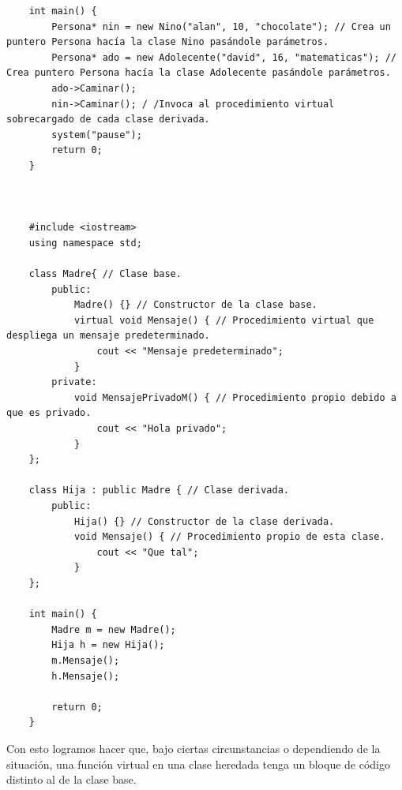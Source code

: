 \begin{lstlisting}
    int main() {
        Persona* nin = new Nino("alan", 10, "chocolate"); // Crea un puntero Persona hacía la clase Nino pasándole parámetros.
        Persona* ado = new Adolecente("david", 16, "matematicas"); // Crea puntero Persona hacía la clase Adolecente pasándole parámetros.
        ado->Caminar();
        nin->Caminar(); / /Invoca al procedimiento virtual sobrecargado de cada clase derivada.
        system("pause");
        return 0;
    }
    
    
    
    #include <iostream>
    using namespace std;
    
    class Madre{ // Clase base.
        public:
            Madre() {} // Constructor de la clase base.
            virtual void Mensaje() { // Procedimiento virtual que despliega un mensaje predeterminado.
                cout << "Mensaje predeterminado";
            }
        private:
            void MensajePrivadoM() { // Procedimiento propio debido a que es privado.
                cout << "Hola privado";
            }
    };
    
    class Hija : public Madre { // Clase derivada.
        public:
            Hija() {} // Constructor de la clase derivada.
            void Mensaje() { // Procedimiento propio de esta clase.
                cout << "Que tal";
            }
    };
    
    int main() {
        Madre m = new Madre();
        Hija h = new Hija();
        m.Mensaje();
        h.Mensaje();
        
        return 0;
    }
\end{lstlisting}

Con esto logramos hacer que, bajo ciertas circunstancias o dependiendo de la situación, una función virtual en una clase heredada tenga un bloque de código distinto al de la clase base.

